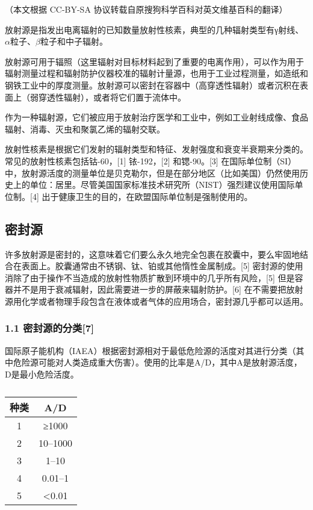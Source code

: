 
（本文根据 CC-BY-SA 协议转载自原搜狗科学百科对英文维基百科的翻译）

放射源是指发出电离辐射的已知数量放射性核素，典型的几种辐射类型有γ射线、$\alpha$粒子、$\beta$粒子和中子辐射。

放射源可用于辐照（这里辐射对目标材料起到了重要的电离作用），可以作为用于辐射测量过程和辐射防护仪器校准的辐射计量源，也用于工业过程测量，如造纸和钢铁工业中的厚度测量。放射源可以密封在容器中（高穿透性辐射）或者沉积在表面上（弱穿透性辐射），或者将它们置于流体中。

作为一种辐射源，它们被应用于放射治疗医学和工业中，例如工业射线成像、食品辐射、消毒、灭虫和聚氯乙烯的辐射交联。

放射性核素是根据它们发射的辐射类型和特征、发射强度和衰变半衰期来分类的。常见的放射性核素包括钴-60，[1] 铱-192，[2] 和锶-90。[3] 在国际单位制（SI）中，放射源活度的测量单位是贝克勒尔，但是在部分地区（比如美国）仍然使用历史上的单位：居里。尽管美国国家标准技术研究所（NIST）强烈建议使用国际单位制。[4] 出于健康卫生的目的，在欧盟国际单位制是强制使用的。

\subsection{密封源}
许多放射源是密封的，这意味着它们要么永久地完全包裹在胶囊中，要么牢固地结合在表面上。胶囊通常由不锈钢、钛、铂或其他惰性金属制成。[5] 密封源的使用消除了由于操作不当造成的放射性物质扩散到环境中的几乎所有风险，[5] 但是容器并不是用于衰减辐射，因此需要进一步的屏蔽来辐射防护。[6] 在不需要把放射源用化学或者物理手段包含在液体或者气体的应用场合，密封源几乎都可以适用。

\subsubsection{1.1 密封源的分类[7]}
国际原子能机构（IAEA）根据密封源相对于最低危险源的活度对其进行分类（其中危险源可能对人类造成重大伤害）。使用的比率是A/D，其中A是放射源活度，D是最小危险活度。
\begin{table}[ht]
\centering
\caption\label{FSY}
\begin{tabular}{|c|c}
\hline
\textbf{种类} & \textbf{A/D}\\
\hline
1 & ≥1000\\
\hline
2 & 10–1000\\
\hline
3 & 1–10\\
\hline
4 & 0.01–1\\
\hline
5 & <0.01\\
\hline
\end{tabular}
\end{table}
